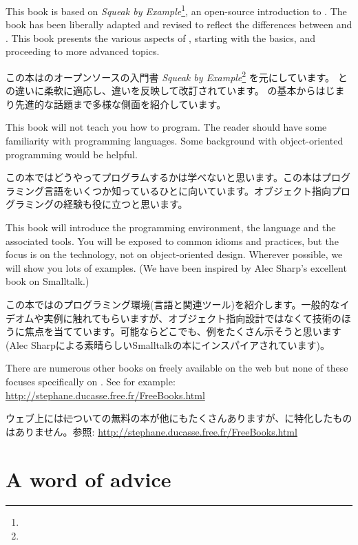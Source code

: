 \documentclass[a4paper,10pt,twoside]{book}
\begin{document}
This book is based on \emph{Squeak by Example}\footnote{\sbe}, an open-source introduction to \squeak.
The book has been liberally adapted and revised to reflect the differences between \pharo and \squeak.
This book presents the various aspects of \pharo, starting with the basics, and proceeding to more advanced topics.

この本は\squeak のオープンソースの入門書 \emph{Squeak by Example}\footnote{\sbe} を元にしています。
\pharo と\squeak の違いに柔軟に適応し、違いを反映して改訂されています。
\pharo の基本からはじまり先進的な話題まで多様な側面を紹介しています。

This book will not teach you how to program. The reader should have some familiarity with programming languages. Some background with object-oriented programming would be helpful.

この本ではどうやってプログラムするかは学べないと思います。この本はプログラミング言語をいくつか知っているひとに向いています。オブジェクト指向プログラミングの経験も役に立つと思います。

This book will introduce the \pharo programming environment, the language and the associated tools.  You will be exposed to common idioms and practices, but the focus is on the technology, not on object-oriented design. Wherever possible, we will show you lots of examples. (We have been inspired by Alec Sharp's excellent book on Smalltalk\cite{Shar97a}.)

この本では\pharo のプログラミング環境(言語と関連ツール)を紹介します。一般的なイデオムや実例に触れてもらいますが、オブジェクト指向設計ではなくて技術のほうに焦点を当てています。可能ならどこでも、例をたくさん示そうと思います(Alec Sharpによる素晴らしいSmalltalkの本\cite{Shar97a}にインスパイアされています)。

There are numerous other books on \st freely available on the web but none of these focuses specifically on \pharo. See for example:
\url{http://stephane.ducasse.free.fr/FreeBooks.html}

ウェブ上には\st についての無料の本が他にもたくさんありますが、\pharo に特化したものはありません。参照:
\url{http://stephane.ducasse.free.fr/FreeBooks.html}

\ifluluelse{}{\newpage} %
\section*{A word of advice}
\end{document}
